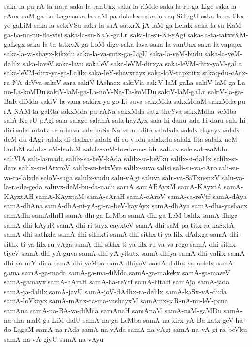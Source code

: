 {saka-la-pu-rA-ta-nara
saka-la-ranUnx
saka-la-riMde
saka-la-ru-ga-Lige
saka-la-sAnx-naM-ga-Lo-Lage
saka-la-saM-pa-dakekx
saka-la-saq-SiTxgU
saka-la-sa-tikx-ye-gaLiM
saka-la-setxVSu
saka-la-shA-satxrX-jA-laM-ga-Lelalx
saka-la-su-KaM-ga-La-na-nu-Ba-visi
saka-la-su-KaM-gaLu
saka-la-su-Ki-yAgi
saka-la-ta-tatxvXM-gaLegx
saka-la-ta-tatxvX-ga-LoM-dige
saka-lava
saka-la-vanUnx
saka-la-vapapx
saka-la-va-shayx-kikxdu
saka-la-va-sutx-ga-LigU
saka-la-veM-budu
saka-la-veM-dalilx
saka-laveV
saka-lavu
sakaleV
saka-leVM-dirxya
saka-leVM-dirx-yaM-gaLa
saka-leVM-dirx-ya-ga-Lalilx
saka-leY-shavxrayx
saka-loV-tapxtitx
sakaq-du-cAcx-ra-NA-deVva
sakeV-sara
sakiV-lAshacx
sakiVla
sakiV-laM-gaLa
sakiV-laM-ga-La-no-La-koMDu
sakiV-laM-ga-La-noV-Na-Ta-koMDu
sakiV-laM-gaLu
sakiV-la-ga-BaR-diMda
sakiV-la-vana
sakirx-ya-go-Li-suva
sakxMda
sakxMdaM
sakxMda-pu-rA-NAM-ta-gaRta
sakxMda-pu-rANa
sakxMda-satx-theYva
sakxMdha-veMba
salA-Ke-rU-pAgi
sala
salage
salahA
sala-hayAyx
sala-hi-danu
sala-hi-daru
sala-hi-diri
sala-hutatx
sala-huva
sala-kaSx-Na-va-nu-dita
salalxda
salalx-dayayx
salalx-deM-du-dAgi
salalx-di-dadxre
salalx-di-ru-vudu
salalxdu
salalx-lita
salalx-neM-budaM
salalx-reM-budaM
salalx-veM-bu-da-na-ridu
salavx
sale
sale-saMdu
saliVlA
sali-la-mada
salilx-sa-beV-kAda
salilx-sa-beVku
salilx-si-dalilx
salilx-si-dare
salilx-su-tAtxroV
salilx-su-tetxVve
salilx-suva
salisi
sali-su-va-rAro
sali-su-va-ra-lalxde
saloV-suga
salulx-vudu
salu-vAgi
saluva
salu-va-SaTxnenxV
salu-va-la-ra-de-geda
saluvx-deM-bu-da-nadu
samA
samABAyxM
samA-KAyxtA
samA-KAyxtAH
samA-KAyxtaM
samA-cAraH
samA-cAroV
samA-ca-reVtf
samA-dAya
samA-dhAna
samA-dhA-ni-yA-gi-ra-beV-kayAyx
samA-dhAya
samA-dha-yashacx
samAdhi
samAdhiH
samA-dhi-ga-LeMba
samA-dhi-ga-LeM-balilx
samA-dhige
samA-dhi-kAyaR
samA-dhi-ri-tuyx-cayxteV
samA-dhi-saM-pa-titx-ra-kaSxtA
samA-dhi-sathxla
samA-dhi-sithxti
samA-dhi-sithx-ti-ya-lilx-dAdxga
samA-dhi-sithx-ti-ya-lilx-ru-vAga
samA-dhi-sithx-ti-ya-lilx-ru-va-va-rege
samA-dhi-sithx-tiyeV
samA-dhi-yA-guva
samA-dhi-yA-yitutx
samA-dhiya
samA-dhi-yalilx
samA-dhi-ya-neY-dida
samA-dhi-yeMba
samA-dhiyoV
samA-didhx-ya-nolelx
samA-gama
samA-ga-mada
samA-ga-ma-diMda
samA-ga-makekx
samA-ga-maveV
samA-gamayx
samA-hAraH
samA-ha-reVtf
samA-hitaH
samAja
samA-jada
samA-ja-dalilx
samA-javU
samA-joV-dAdhx-ra-dalilx
samA-kaSx-vA-duda
samA-loVkayx
samA-mAnx-ta-ma-vashayxM
samAmx-jaR-nA-nu-leV-pana
samAna
samA-na-BA-va-diMda
samAnaH
samAnaM
samA-naM-gaMDu
samA-na-dha-maR-ga-LiM-dalU
samA-na-ga-LeMba
samA-na-kirx-yA-Ba-katx-geV-ha-do-LagaM
samA-na-rAda
samA-na-vAda
samA-na-vAgi
samA-na-vA-gi-ra-beVku
samA-na-vA-giyU
samA-na-vAyu
}
